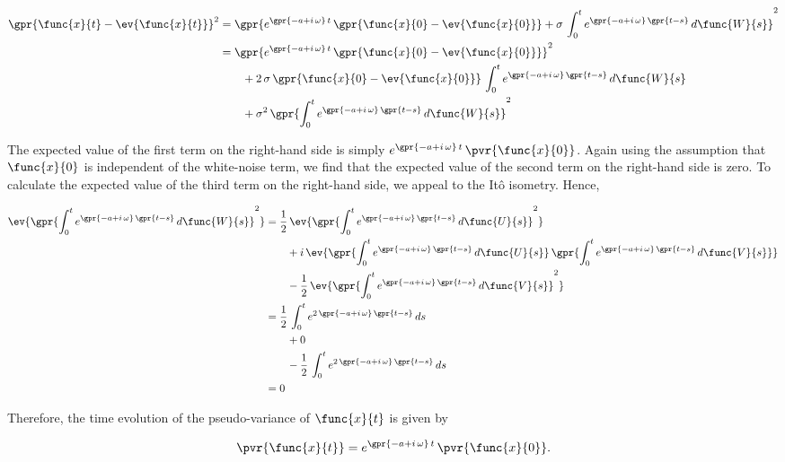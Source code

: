 \begin{align}
	\gpr{\func{x}{t} - \ev{\func{x}{t}}}^2 &= \gpr{e^{\gpr{-a + i\,\omega}\,t}\,\gpr{\func{x}{0} - \ev{\func{x}{0}}} + \sigma\,\int_{0}^{t} e^{\gpr{-a + i\,\omega}\,\gpr{t - s}}\,d\func{W}{s}}^2 \nonumber \\
		&= \gpr{e^{\gpr{-a + i\,\omega}\,t}\,\gpr{\func{x}{0} - \ev{\func{x}{0}}}}^2 \nonumber \\
			&\qquad + 2\,\sigma\,\gpr{\func{x}{0} - \ev{\func{x}{0}}}\,\int_{0}^{t} e^{\gpr{-a + i\,\omega}\,\gpr{t - s}}\,d\func{W}{s} \nonumber \\
			&\qquad + \sigma^2\,\gpr{\int_{0}^{t} e^{\gpr{-a + i\,\omega}\,\gpr{t - s}}\,d\func{W}{s}}^2
\end{align}

The expected value of the first term on the right-hand side is simply $e^{\gpr{-a + i\,\omega}\,t}\,\pvr{\func{x}{0}}$. Again using the assumption that $\func{x}{0}$ is independent of the white-noise term, we find that the expected value of the second term on the right-hand side is zero. To calculate the expected value of the third term on the right-hand side, we appeal to the It\^{o} isometry. Hence,

\begin{align}
	\ev{\gpr{\int_{0}^{t} e^{\gpr{-a + i\,\omega}\,\gpr{t - s}}\,d\func{W}{s}}^2} &= \frac{1}{2}\,\ev{\gpr{\int_{0}^{t} e^{\gpr{-a + i\,\omega}\,\gpr{t - s}}\,d\func{U}{s}}^2} \nonumber \\
			&\qquad + i\,\ev{\gpr{\int_{0}^{t} e^{\gpr{-a + i\,\omega}\,\gpr{t - s}}\,d\func{U}{s}}\,\gpr{\int_{0}^{t} e^{\gpr{-a + i\,\omega}\,\gpr{t - s}}\,d\func{V}{s}}} \nonumber \\
			&\qquad - \frac{1}{2}\,\ev{\gpr{\int_{0}^{t} e^{\gpr{-a + i\,\omega}\,\gpr{t - s}}\,d\func{V}{s}}^2} \nonumber \\
		&= \frac{1}{2}\,\int_{0}^{t} e^{2\,\gpr{-a + i\,\omega}\,\gpr{t - s}}\,ds \nonumber \\
			&\qquad + 0 \nonumber \\
			&\qquad - \frac{1}{2}\,\int_{0}^{t} e^{2\,\gpr{-a + i\,\omega}\,\gpr{t - s}}\,ds \nonumber \\
		&= 0
\end{align}

Therefore, the time evolution of the pseudo-variance of $\func{x}{t}$ is given by

\begin{equation}
	\pvr{\func{x}{t}} = e^{\gpr{-a + i\,\omega}\,t}\,\pvr{\func{x}{0}}.
\end{equation}

